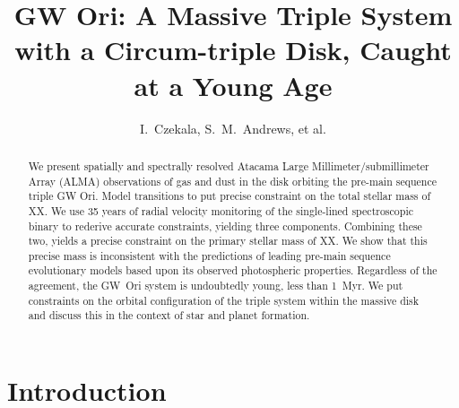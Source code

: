 \documentclass[twocolumn]{aastex61}
\begin{document}
\title{GW Ori: A Massive Triple System with a Circum-triple Disk, Caught at a Young Age}
\author{I.~Czekala, S.~M.~Andrews, et al.} %

\begin{abstract}
We present spatially and spectrally resolved Atacama Large Millimeter/submillimeter Array (ALMA) observations of gas and dust in the disk orbiting the pre-main sequence triple GW Ori. Model transitions to put precise constraint on the total stellar mass of XX. We use 35 years of radial velocity monitoring of the single-lined spectroscopic binary to rederive accurate constraints, yielding three components. Combining these two, yields a precise constraint on the primary stellar mass of XX. We show that this precise mass is inconsistent with the predictions of leading pre-main sequence evolutionary models based upon its observed photospheric properties. Regardless of the agreement, the GW~Ori system is undoubtedly young, less than 1~Myr. We put constraints on the orbital configuration of the triple system within the massive disk and discuss this in the context of star and planet formation.
\end{abstract}


\section{Introduction} \label{sec:intro}

\end{document}
